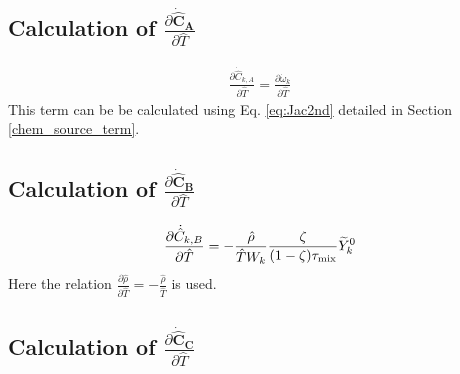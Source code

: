 \subsection*{Calculation of $\frac{\partial \boldsymbol{\dot{\hat{C}}_A}}{\partial \hat{T}}$}
\begin{align}\label{eq:JacCAT}
\frac{\partial {\dot{\hat{C}}_{k,A}}}{\partial \hat{T}} = \frac{\partial \dot{\omega}_k}{\partial \hat{T}}
\end{align}
This term can be be calculated using Eq. \ref{eq:Jac2nd} detailed in Section \ref{chem_source_term}.




\subsection*{Calculation of $\frac{\partial \boldsymbol{\dot{\hat{C}}_B}}{\partial \hat{T}}$}
\begin{align}\label{eq:JacCBT}
\frac{\partial {\dot{\hat{C}}_{k,B}}}{\partial \hat{T}} = - \frac{\hat{\rho}}{\hat{T} W_k} \frac{\zeta}{(1-\zeta) \tau_{\rm mix}} \widetilde{Y}_k^0
\end{align}
Here the relation $\frac{\partial \hat{\rho}}{\partial \hat{T}} = -\frac{\hat{\rho}}{\hat{T}}$ is used.

\subsection*{Calculation of $\frac{\partial \boldsymbol{\dot{\hat{C}}_C}}{\partial \hat{T}}$}

